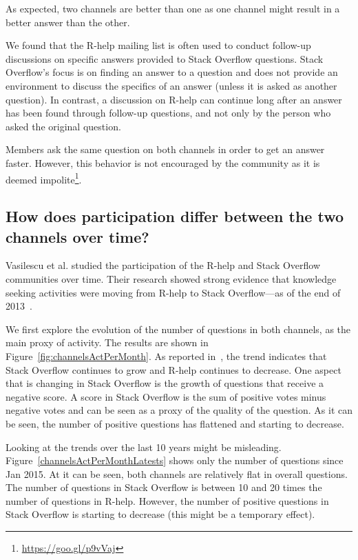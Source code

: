 \documentclass[smallextended]{svjour3}       %
\newcommand{\SO}{Stack Overflow\xspace}
\newcommand{\RH}{R-help\xspace}
\newcommand{\rqd}{How does participation differ between the two channels over time?}
\begin{document}
\begin{description}[itemsep=2pt, topsep=0pt, leftmargin=1em, parsep=0pt]
\item[Find a better answer:] As expected, two channels are better than one as 
  one channel might result in a better answer than the other.
\item[Support follow-up questions:] We found that the \RH mailing list is often used to conduct follow-up discussions on
  specific answers provided to \SO questions. \SO's focus is on finding an answer to a question and does not
  provide an environment to discuss the specifics of an answer (unless it is asked as another question).
In contrast, a discussion on \RH can continue long after an answer has been found through follow-up questions, and not only by the person who asked the original question.  
\item[Speed up answers:] Members ask the same question on both channels in order to get an answer faster. However, this behavior is not encouraged by the community as it is deemed impolite\footnote{\href{https://goo.gl/p9vVaj}{https://goo.gl/p9vVaj}}.
\end{description}


\subsection{\rqd}

Vasilescu et al. studied the participation of the \RH and \SO communities over time. Their
research showed strong evidence that knowledge seeking activities were moving from \RH to \SO---as of the end of
2013~\cite{Vasilescu2014c}.

We first explore the evolution of the number of questions in both channels, as the main proxy of activity. The results
are shown in Figure~\ref{fig:channelsActPerMonth}. As reported in~\cite{Vasilescu2014c}, the trend indicates that \SO
continues to grow and \RH continues to decrease. One aspect that is changing in \SO is the growth of questions that
receive a negative score. A score in \SO is the sum of positive votes minus negative votes and can be seen as a proxy of
the quality of the question. As it can be seen, the number of positive questions has flattened and starting to decrease.

Looking at the trends over the last 10 years might be misleading. Figure~\ref{channelsActPerMonthLatests} shows only the
number of questions since Jan 2015. At it can be seen, both channels are relatively flat in overall questions. The
number of questions in \SO is between 10 and 20 times the number of questions in \RH. However, the number of positive
questions in \SO is starting to decrease (this might be a temporary effect).
\end{document}
